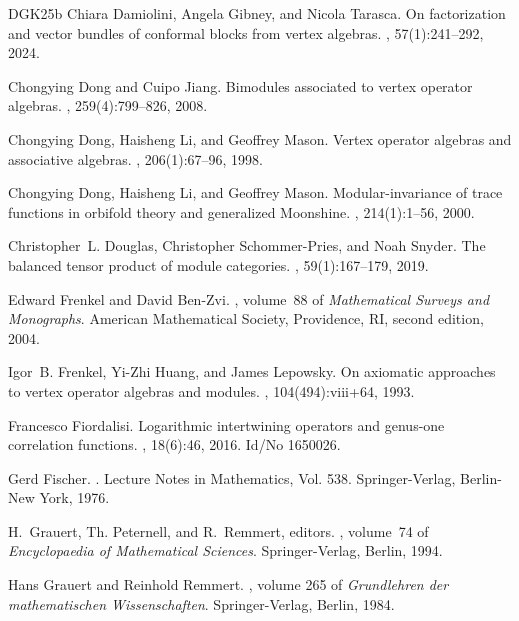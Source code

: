 \documentclass[11pt,b5paper,notitlepage]{article}
\theoremstyle{definition}
\theoremstyle{plain}
\newcommand{\<}{\left\langle}
\renewcommand{\>}{\right\rangle}
\numberwithin{equation}{section}
\begin{document}
\begin{thebibliography}{DGK25b}
Chiara Damiolini, Angela Gibney, and Nicola Tarasca.
\newblock On factorization and vector bundles of conformal blocks from vertex
  algebras.
, 57(1):241--292, 2024.

Chongying Dong and Cuipo Jiang.
\newblock Bimodules associated to vertex operator algebras.
, 259(4):799--826, 2008.

Chongying Dong, Haisheng Li, and Geoffrey Mason.
\newblock Vertex operator algebras and associative algebras.
, 206(1):67--96, 1998.

Chongying Dong, Haisheng Li, and Geoffrey Mason.
\newblock Modular-invariance of trace functions in orbifold theory and
  generalized {Moonshine}.
, 214(1):1--56, 2000.

Christopher~L. Douglas, Christopher Schommer-Pries, and Noah Snyder.
\newblock The balanced tensor product of module categories.
, 59(1):167--179, 2019.

Edward Frenkel and David Ben-Zvi.
, volume~88 of {\em
  Mathematical Surveys and Monographs}.
\newblock American Mathematical Society, Providence, RI, second edition, 2004.

Igor~B. Frenkel, Yi-Zhi Huang, and James Lepowsky.
\newblock On axiomatic approaches to vertex operator algebras and modules.
, 104(494):viii+64, 1993.

Francesco Fiordalisi.
\newblock Logarithmic intertwining operators and genus-one correlation
  functions.
, 18(6):46, 2016.
\newblock Id/No 1650026.

Gerd Fischer.
.
\newblock Lecture Notes in Mathematics, Vol. 538. Springer-Verlag, Berlin-New
  York, 1976.

H.~Grauert, Th. Peternell, and R.~Remmert, editors.
, volume~74 of {\em Encyclopaedia of Mathematical Sciences}.
\newblock Springer-Verlag, Berlin, 1994.

Hans Grauert and Reinhold Remmert.
, volume 265 of {\em Grundlehren der
  mathematischen Wissenschaften}.
\newblock Springer-Verlag, Berlin, 1984.


\end{thebibliography}
\end{document}
